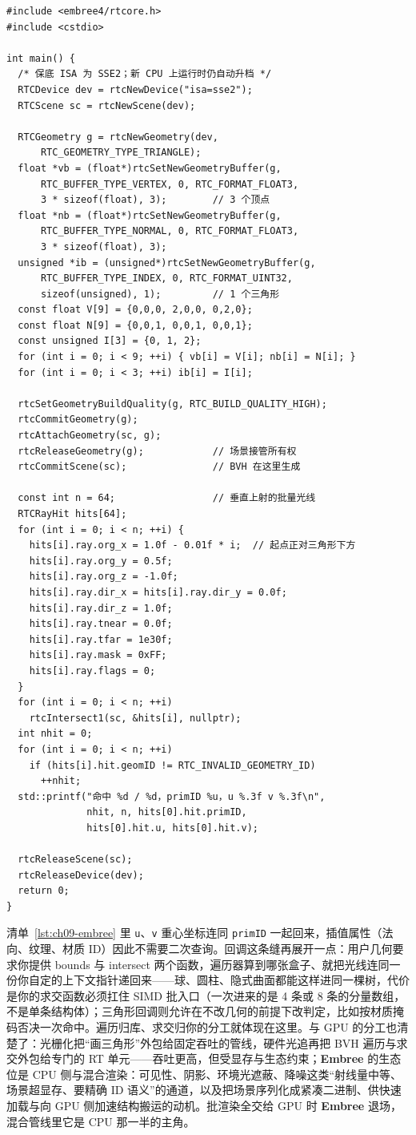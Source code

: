 \documentclass[12pt,a4paper,fontset=fandol]{ctexbook}
\newcommand{\Tp}[1]{\texttt{#1}}
\newcommand{\Lib}[1]{\textbf{#1}}
\begin{document}
\begin{lstlisting}[style=cppstyle,caption={\Lib{Embree}：建三角网格场景、提交 BVH 并批量求交},label={lst:ch09-embree}]
#include <embree4/rtcore.h>
#include <cstdio>

int main() {
  /* 保底 ISA 为 SSE2；新 CPU 上运行时仍自动升档 */
  RTCDevice dev = rtcNewDevice("isa=sse2");
  RTCScene sc = rtcNewScene(dev);

  RTCGeometry g = rtcNewGeometry(dev,
      RTC_GEOMETRY_TYPE_TRIANGLE);
  float *vb = (float*)rtcSetNewGeometryBuffer(g,
      RTC_BUFFER_TYPE_VERTEX, 0, RTC_FORMAT_FLOAT3,
      3 * sizeof(float), 3);        // 3 个顶点
  float *nb = (float*)rtcSetNewGeometryBuffer(g,
      RTC_BUFFER_TYPE_NORMAL, 0, RTC_FORMAT_FLOAT3,
      3 * sizeof(float), 3);
  unsigned *ib = (unsigned*)rtcSetNewGeometryBuffer(g,
      RTC_BUFFER_TYPE_INDEX, 0, RTC_FORMAT_UINT32,
      sizeof(unsigned), 1);         // 1 个三角形
  const float V[9] = {0,0,0, 2,0,0, 0,2,0};
  const float N[9] = {0,0,1, 0,0,1, 0,0,1};
  const unsigned I[3] = {0, 1, 2};
  for (int i = 0; i < 9; ++i) { vb[i] = V[i]; nb[i] = N[i]; }
  for (int i = 0; i < 3; ++i) ib[i] = I[i];

  rtcSetGeometryBuildQuality(g, RTC_BUILD_QUALITY_HIGH);
  rtcCommitGeometry(g);
  rtcAttachGeometry(sc, g);
  rtcReleaseGeometry(g);            // 场景接管所有权
  rtcCommitScene(sc);               // BVH 在这里生成

  const int n = 64;                 // 垂直上射的批量光线
  RTCRayHit hits[64];
  for (int i = 0; i < n; ++i) {
    hits[i].ray.org_x = 1.0f - 0.01f * i;  // 起点正对三角形下方
    hits[i].ray.org_y = 0.5f;
    hits[i].ray.org_z = -1.0f;
    hits[i].ray.dir_x = hits[i].ray.dir_y = 0.0f;
    hits[i].ray.dir_z = 1.0f;
    hits[i].ray.tnear = 0.0f;
    hits[i].ray.tfar = 1e30f;
    hits[i].ray.mask = 0xFF;
    hits[i].ray.flags = 0;
  }
  for (int i = 0; i < n; ++i)
    rtcIntersect1(sc, &hits[i], nullptr);
  int nhit = 0;
  for (int i = 0; i < n; ++i)
    if (hits[i].hit.geomID != RTC_INVALID_GEOMETRY_ID)
      ++nhit;
  std::printf("命中 %d / %d，primID %u，u %.3f v %.3f\n",
              nhit, n, hits[0].hit.primID,
              hits[0].hit.u, hits[0].hit.v);

  rtcReleaseScene(sc);
  rtcReleaseDevice(dev);
  return 0;
}
\end{lstlisting}

清单~\ref{lst:ch09-embree} 里 \Tp{u}、\Tp{v} 重心坐标连同 \Tp{primID} 一起回来，插值属性（法向、纹理、材质 ID）因此不需要二次查询。回调这条缝再展开一点：用户几何要求你提供 bounds 与 intersect 两个函数，遍历器算到哪张盒子、就把光线连同一份你自定的上下文指针递回来——球、圆柱、隐式曲面都能这样进同一棵树，代价是你的求交函数必须扛住 SIMD 批入口（一次进来的是 4 条或 8 条的分量数组，不是单条结构体）；三角形回调则允许在不改几何的前提下改判定，比如按材质掩码否决一次命中。遍历归库、求交归你的分工就体现在这里。与 GPU 的分工也清楚了：光栅化把``画三角形''外包给固定吞吐的管线，硬件光追再把 BVH 遍历与求交外包给专门的 RT 单元——吞吐更高，但受显存与生态约束；\Lib{Embree} 的生态位是 CPU 侧与混合渲染：可见性、阴影、环境光遮蔽、降噪这类``射线量中等、场景超显存、要精确 ID 语义''的通道，以及把场景序列化成紧凑二进制、供快速加载与向 GPU 侧加速结构搬运的动机。批渲染全交给 GPU 时 \Lib{Embree} 退场，混合管线里它是 CPU 那一半的主角。
\end{document}
